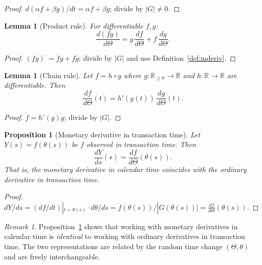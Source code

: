 \documentclass[twocolumn,11pt,a4paper]{article}
\theoremstyle{thmstyle}
\newtheorem{lemma}[theorem]{Lemma}
\newtheorem{proposition}[theorem]{Proposition}
\theoremstyle{definition}
\theoremstyle{remark}
\newtheorem{remark}[theorem]{Remark}
\newcommand{\Gain}{G}                        %
\newcommand{\Clock}{\Theta}                  %
\newcommand{\InvClock}{\theta}               %
\newcommand{\Mdiff}[1]{\frac{d#1}{d\Clock}} %
\newcommand{\Real}{\mathbb{R}}
\begin{document}
\begin{proof}
$d(\alpha f+\beta g)/dt = \alpha\dot{f}+\beta\dot{g}$;
divide by $|\Gain|\neq 0$.
\end{proof}

\begin{lemma}[Product rule]\label{lem:product}
For differentiable $f,g$:
\begin{equation}
  \Mdiff{(fg)} = g\,\Mdiff{f} + f\,\Mdiff{g}.
\end{equation}
\end{lemma}

\begin{proof}
$(fg)^{\cdot} = \dot{f}g+f\dot{g}$; divide by $|\Gain|$
and use Definition~\ref{def:mderiv}.
\end{proof}

\begin{lemma}[Chain rule]\label{lem:chain}
Let $f = h \circ g$ where $g:\Real_{\geq 0}\to\Real$
and $h:\Real\to\Real$ are differentiable.  Then
\begin{equation}
  \Mdiff{f}(t) = h'(g(t))\,\Mdiff{g}(t).
\end{equation}
\end{lemma}

\begin{proof}
$\dot{f} = h'(g)\dot{g}$; divide by $|\Gain|$.
\end{proof}

\begin{proposition}[Monetary derivative in transaction time]\label{prop:mderiv-transtime}
Let $Y(s) = f(\InvClock(s))$ be $f$ observed in
transaction time.  Then
\begin{equation}\label{eq:mderiv-transtime}
  \frac{dY}{ds}(s) = \Mdiff{f}(\InvClock(s)).
\end{equation}
That is, the monetary derivative in calendar time
coincides with the ordinary derivative in transaction time.
\end{proposition}

\begin{proof}
$dY/ds = (df/dt)|_{t=\InvClock(s)}\cdot d\InvClock/ds
= \dot{f}(\InvClock(s))/|\Gain(\InvClock(s))|
= \Mdiff{f}(\InvClock(s))$.
\end{proof}

\begin{remark}\label{rem:unification}
Proposition~\ref{prop:mderiv-transtime} shows that working
with monetary derivatives in calendar time is \emph{identical}
to working with ordinary derivatives in transaction time.
The two representations are related by the random time
change $(\Clock,\InvClock)$ and are freely interchangeable.
\end{remark}
\end{document}
